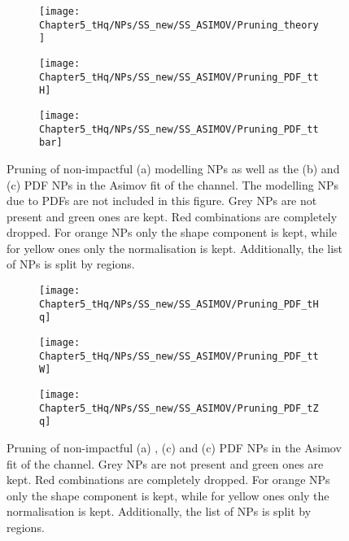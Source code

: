 \begin{figure}[h]
  \centering
  \begin{subfigure}{0.45\textwidth}
      	\texttt{[image: Chapter5\_tHq/NPs/SS\_new/SS\_ASIMOV/Pruning\_theory]}
	\caption{}
  \end{subfigure}
  \hfill
  \begin{subfigure}{0.45\textwidth}
 	\texttt{[image: Chapter5\_tHq/NPs/SS\_new/SS\_ASIMOV/Pruning\_PDF\_ttH]}
	\caption{}
  	\texttt{[image: Chapter5\_tHq/NPs/SS\_new/SS\_ASIMOV/Pruning\_PDF\_ttbar]}
	\caption{}  
  \end{subfigure}
   \caption{Pruning of non-impactful (a) modelling NPs as well as the (b) \ttH and (c) \ttbar PDF NPs in the Asimov fit of the \dilepSStau channel. 
   The modelling NPs due to PDFs are not included in this figure. Grey NPs are 
   not present and green ones are kept. Red combinations are completely dropped. For orange NPs only the shape 
   component is kept, while for yellow ones only the normalisation is kept. Additionally, the list of NPs is split by regions.}
  \label{fig:Appendix:AdditionalResults:SS:Asimov:Pruning:Theory}
\end{figure}

\begin{figure}[h]
  \centering
    \begin{subfigure}{0.3\textwidth}
  \texttt{[image: Chapter5\_tHq/NPs/SS\_new/SS\_ASIMOV/Pruning\_PDF\_tHq]}
	\caption{}
  \end{subfigure}
  \begin{subfigure}{0.3\textwidth}
    \texttt{[image: Chapter5\_tHq/NPs/SS\_new/SS\_ASIMOV/Pruning\_PDF\_ttW]}
  	\caption{}
  \end{subfigure}
  \begin{subfigure}{0.3\textwidth}
  \texttt{[image: Chapter5\_tHq/NPs/SS\_new/SS\_ASIMOV/Pruning\_PDF\_tZq]}
  \caption{}
  \end{subfigure}
   \caption{Pruning of non-impactful (a) \tHq, (c) \ttW and (c) \tZq PDF NPs in the Asimov fit of the \dilepSStau channel. Grey NPs are 
   not present and green ones are kept. Red combinations are completely dropped. For orange NPs only the shape 
   component is kept, while for yellow ones only the normalisation is kept. Additionally, the list of NPs is split by regions.}
  \label{fig:Appendix:AdditionalResults:SS:Asimov:Pruning:tHqPDF}
\end{figure}

